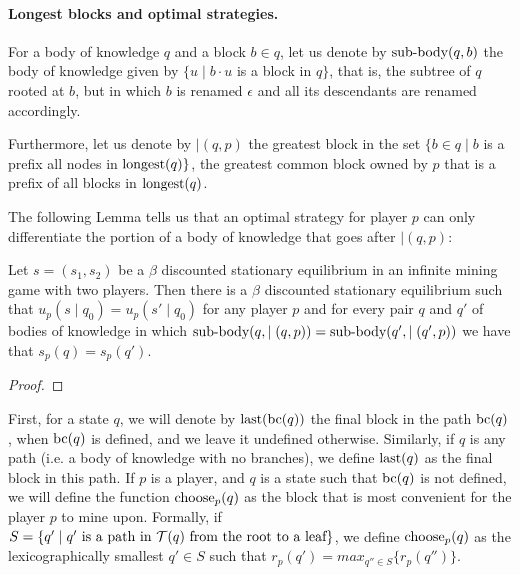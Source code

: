 \paragraph{Longest blocks and optimal strategies.}
For a body of knowledge $q$ and a block $b \in q$, let us denote by ${\text{\rm sub-body}}(q,b)$ the body of knowledge 
given by $\{u \mid b\cdot u$ is a block in $q\}$, that is, the subtree of $q$ rooted at $b$, but in which $b$ is renamed 
$\epsilon$ and all its descendants are renamed accordingly. 

Furthermore, let us denote by $\mid(q,p)$ the greatest block in the set $\{b \in q \mid b$ is a prefix all nodes in ${\text{\rm longest}}(q)\}$, the greatest common block owned by $p$ that is a prefix of all 
blocks in ${\text{\rm longest}}(q)$. 

The following Lemma tells us that an optimal strategy for player $p$ can only differentiate the portion of 
a body of knowledge that goes after $\mid(q,p)$: 

\begin{mylem}
Let $s = (s_1,s_2)$ be a $\beta$ discounted stationary equilibrium in an infinite mining game with two players. 
Then there is a $\beta$ discounted stationary equilibrium such that $u_p(s \mid q_0) = u_p(s' \mid q_0)$ for 
any player $p$ and for every pair $q$ and $q'$ of 
bodies of knowledge in which ${\text{\rm sub-body}}(q,\mid(q,p)) = {\text{\rm sub-body}}(q',\mid(q',p))$ we have that 
$s_p(q) = s_p(q')$. 
\end{mylem}

\begin{proof}
\end{proof}


\bigskip



First, for a state $q$, we will denote by $\text{\rm last}(\text{bc}(q))$ the final block in the path $\text{bc}(q)$, when $\text{bc}(q)$ is defined, and we leave it undefined otherwise. Similarly, if $q$ is any path (i.e. a body of knowledge with no branches), we define $\text{\rm last}(q)$ as the final block in this path. If $p$ is a player, and $q$ is a state such that $\text{bc}(q)$ is not defined, we will define the function $\text{\rm choose}_p(q)$ as the block that is most convenient for the player $p$ to mine upon. Formally, if $S=\{ q'\mid q' \text{ is a path in } \mathcal{T}(q) \text{ from the root to a leaf}\}$, we define $\text{\rm choose}_p(q)$ as the lexicographically smallest $q'\in S$ such that $r_p(q')=max_{q''\in S} \{r_p(q'')\}$.

%
%
%
%
%
%


